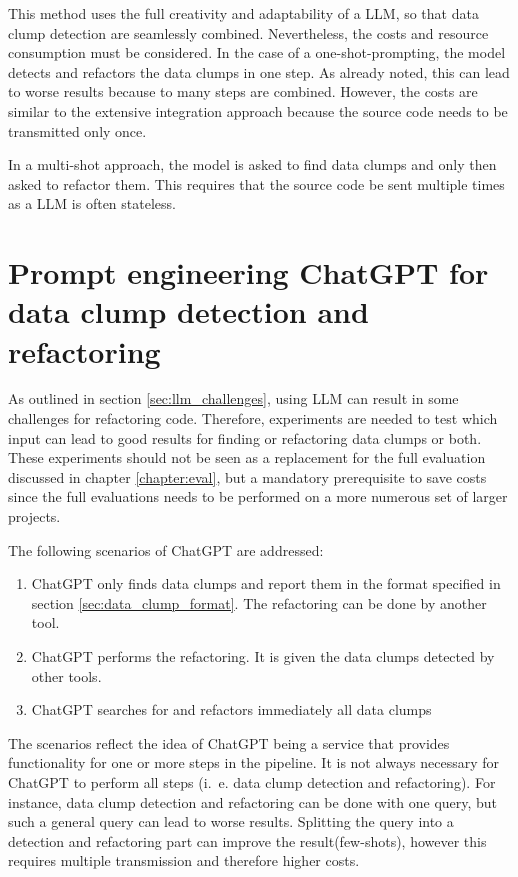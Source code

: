 This method uses the full creativity and adaptability of a \ac{LLM}, so that data clump detection are seamlessly combined. Nevertheless, the costs and resource consumption must be considered. In the case of a one-shot-prompting, the model detects and refactors the data clumps in one step. As already noted, this can lead to worse results because to many steps are combined. However, the costs are similar to the  extensive integration approach because the source code needs to be transmitted only once. 

In a multi-shot approach, the model is asked to find data clumps and only then asked to refactor them. This requires that the source code be sent multiple times as a \ac{LLM} is often stateless. 

\section{Prompt engineering ChatGPT for data clump detection and refactoring}\label{sec:prompt_engineering_impl}

As outlined in  section \ref{sec:llm_challenges}, using \ac{LLM} can result in some challenges for refactoring code. Therefore, experiments are needed to test which input can lead to good results for finding or refactoring data clumps or both. These experiments should not be seen as a replacement for the full evaluation discussed in chapter \ref{chapter:eval}, but a mandatory prerequisite to save costs since the full evaluations needs to be performed on a more numerous set of larger projects.

The following scenarios of ChatGPT are addressed:
\begin{enumerate}
    \item ChatGPT only finds data clumps and report them in the format specified in section \ref{sec:data_clump_format}. The refactoring can be done by another tool.
    \item ChatGPT performs the refactoring. It is given the data clumps detected by other tools. 
    \item ChatGPT searches for and refactors immediately all data clumps
\end{enumerate}

The scenarios reflect the idea of ChatGPT being a service that provides functionality for one or more steps in the pipeline. It is not always necessary for ChatGPT to perform all steps (i.~e.  data clump detection and refactoring). For instance, data clump detection and refactoring can be done with one query, but such a general query can lead to worse  results. Splitting the query into a detection and refactoring part can improve the result(few-shots), however this requires multiple transmission and therefore higher costs. 

